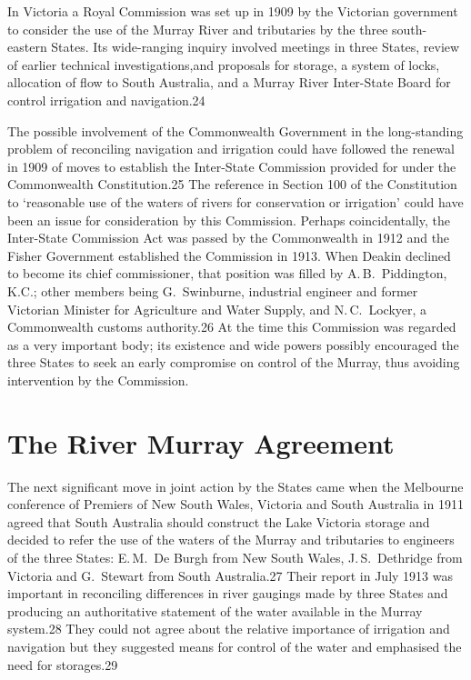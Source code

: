 In Victoria a Royal Commission was set up in 1909 by the Victorian
government to consider the use of the Murray River and tributaries by
the three south-eastern States.  Its wide-ranging inquiry involved
meetings in three States, review of earlier technical
investigations,and proposals for storage, a system of locks,
allocation of flow to South Australia, and a Murray River Inter-State
Board for control irrigation and navigation.24

The possible involvement of the Commonwealth Government in the
long-standing problem of reconciling navigation and irrigation could
have followed the renewal in 1909 of moves to establish the
Inter-State Commission provided for under the Commonwealth
Constitution.25 The reference in Section 100 of the Constitution to
`reasonable use of the waters of rivers for conservation or
irrigation' could have been an issue for consideration by this
Commission.  Perhaps coincidentally, the Inter-State Commission Act
was passed by the Commonwealth in 1912 and the Fisher Government
established the Commission in 1913.  When Deakin declined to become
its chief commissioner, that position was filled by A.\,B.~Piddington,
K.C.; other members being G.~Swinburne, industrial engineer and former
Victorian Minister for Agriculture and Water Supply, and
N.\,C.~Lockyer, a Commonwealth customs authority.26 At the time this
Commission was regarded as a very important body; its existence and
wide powers possibly encouraged the three States to seek an early
compromise on control of the Murray, thus avoiding intervention by the
Commission.

\section{The River Murray Agreement}

The next significant move in joint action by the States came when the
Melbourne conference of Premiers of New South Wales, Victoria and
South Australia in 1911 agreed that South Australia should construct
the Lake Victoria storage and decided to refer the use of the waters
of the Murray and tributaries to engineers of the three States:
E.\,M.~De Burgh from New South Wales, J.\,S.~Dethridge from Victoria
and G.~Stewart from South Australia.27 Their report in July 1913 was
important in reconciling differences in river gaugings made by three
States and producing an authoritative statement of the water available
in the Murray system.28 They could not agree about the relative
importance of irrigation and navigation but they suggested means for
control of the water and emphasised the need for storages.29

